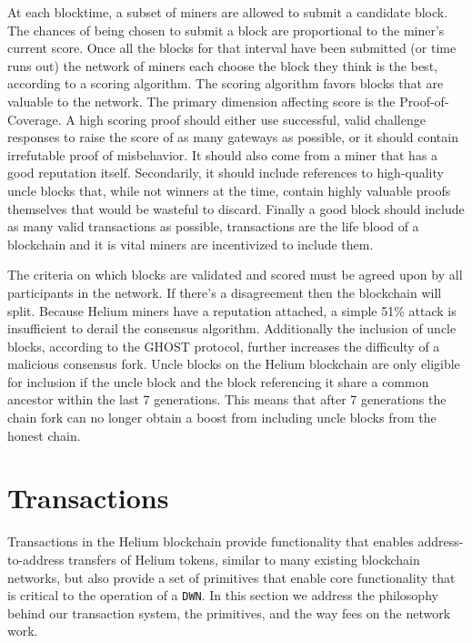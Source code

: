 \documentclass[letterpaper,11pt]{article}
\begin{document}
At each blocktime, a subset of miners are allowed to submit a candidate block. The chances of being chosen to submit a block are proportional to the miner's current score. Once all the blocks for that interval have been submitted (or time runs out) the network of miners each choose the block they think is the best, according to a scoring algorithm. The scoring algorithm favors blocks that are valuable to the network. The primary dimension affecting score is the Proof-of-Coverage. A high scoring proof should either use successful, valid challenge responses to raise the score of as many gateways as possible, or it should contain irrefutable proof of misbehavior. It should also come from a miner that has a good reputation itself. Secondarily, it should include references to high-quality uncle blocks that, while not winners at the time, contain highly valuable proofs themselves that would be wasteful to discard. Finally a good block should include as many valid transactions as possible, transactions are the life blood of a blockchain and it is vital miners are incentivized to include them.

The criteria on which blocks are validated and scored must be agreed upon by all participants in the network. If there's a disagreement then the blockchain will split. Because Helium miners have a reputation attached, a simple 51\% attack is insufficient to derail the consensus algorithm. Additionally the inclusion of uncle blocks, according to the GHOST protocol, further increases the difficulty of a malicious consensus fork. Uncle blocks on the Helium blockchain are only eligible for inclusion if the uncle block and the block referencing it share a common ancestor within the last 7 generations. This means that after 7 generations the chain fork can no longer obtain a boost from including uncle blocks from the honest chain.

\newpage

\section{Transactions}\label{transactions}

Transactions in the Helium blockchain provide functionality that enables address-to-address transfers of Helium tokens, similar to many existing blockchain networks, but also provide a set of primitives that enable core functionality that is critical to the operation of a \verb|DWN|. In this section we address the philosophy behind our transaction system, the primitives, and the way fees on the network work.
\end{document}

